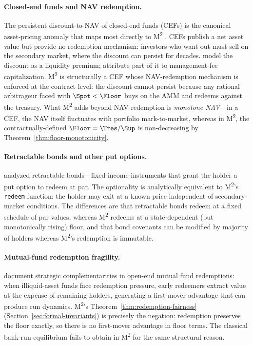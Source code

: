 \paragraph{Closed-end funds and NAV redemption.} The persistent discount-to-NAV of closed-end funds (CEFs) is the canonical asset-pricing anomaly that maps most directly to M\textsuperscript{2} \citep{LeeShleiferThaler1991,Pontiff1996}. CEFs publish a net asset value but provide no redemption mechanism: investors who want out must sell on the secondary market, where the discount can persist for decades. \citet{CherkesSagiStanton2009} model the discount as a liquidity premium; \citet{BerkStanton2007} attribute part of it to management-fee capitalization. M\textsuperscript{2} is structurally a CEF whose NAV-redemption mechanism is enforced at the contract level: the discount cannot persist because any rational arbitrageur faced with $\Spot < \Floor$ buys on the AMM and redeems against the treasury. What M\textsuperscript{2} adds beyond NAV-redemption is \emph{monotone NAV}---in a CEF, the NAV itself fluctuates with portfolio mark-to-market, whereas in M\textsuperscript{2}, the contractually-defined $\Floor = \Tres/\Sup$ is non-decreasing by Theorem~\ref{thm:floor-monotonicity}.

\paragraph{Retractable bonds and other put options.} \citet{BrennanSchwartz1977} analyzed retractable bonds---fixed-income instruments that grant the holder a put option to redeem at par. The optionality is analytically equivalent to M\textsuperscript{2}'s \texttt{redeem} function: the holder may exit at a known price independent of secondary-market conditions. The differences are that retractable bonds redeem at a fixed schedule of par values, whereas M\textsuperscript{2} redeems at a state-dependent (but monotonically rising) floor, and that bond covenants can be modified by majority of holders whereas M\textsuperscript{2}'s redemption is immutable.

\paragraph{Mutual-fund redemption fragility.} \citet{ChenGoldsteinJiang2010} document strategic complementarities in open-end mutual fund redemptions: when illiquid-asset funds face redemption pressure, early redeemers extract value at the expense of remaining holders, generating a first-mover advantage that can produce run dynamics. M\textsuperscript{2}'s Theorem~\ref{thm:redemption-fairness} (Section~\ref{sec:formal-invariants}) is precisely the negation: redemption preserves the floor exactly, so there is no first-mover advantage in floor terms. The classical \citet{DiamondDybvig1983} bank-run equilibrium fails to obtain in M\textsuperscript{2} for the same structural reason.

